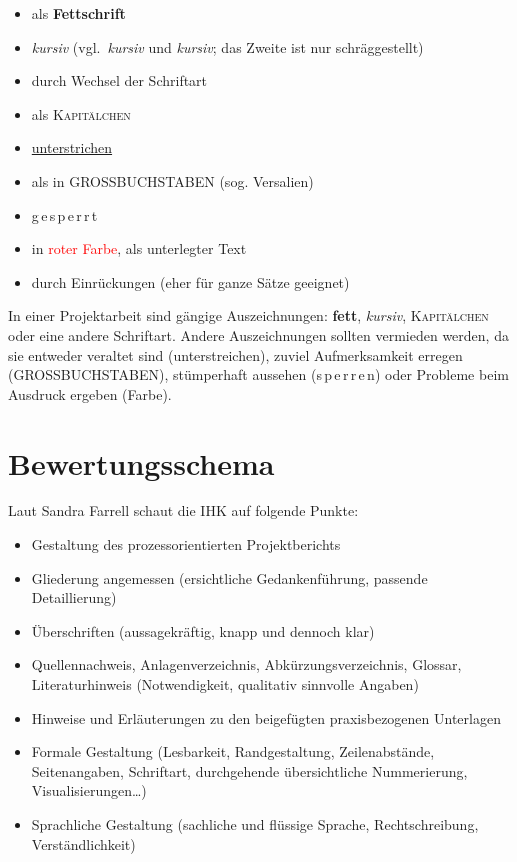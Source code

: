 \documentclass[a4paper,titlepage=true,twoside]{scrartcl}
\begin{document}
\begin{itemize}
 \item als \textbf{Fettschrift}
 \item \textit{kursiv} (vgl.\ \textit{kursiv} und \textsl{kursiv};
   das Zweite ist nur schräggestellt)
 \item \textsf{durch Wechsel der Schriftart}
 \item als \textsc{Kapitälchen}
 \item \underline{unterstrichen}
 \item als in GROSSBUCHSTABEN (sog. Versalien)
 \item g\,e\,s\,p\,e\,r\,r\,t
 \item in \textcolor{red}{roter Farbe}, als \colorbox{light}{unterlegter Text}
 \item durch Einrückungen (eher für ganze Sätze geeignet)
\end{itemize}

In einer Projektarbeit sind gängige Auszeichnungen: \textbf{fett}, \textit{kursiv},
\textsc{Kapitälchen} oder eine andere \textsf{Schriftart}. Andere Auszeichnungen
sollten vermieden werden, da sie entweder veraltet sind (unterstreichen), zuviel
Aufmerksamkeit erregen (GROSSBUCHSTABEN), stümperhaft aussehen
(s\,p\,e\,r\,r\,e\,n) oder Probleme beim Ausdruck ergeben (Farbe).


\appendix
\section{Bewertungsschema}
Laut Sandra Farrell schaut die IHK auf folgende Punkte:

\begin{itemize}
 \item Gestaltung des prozessorientierten Projektberichts
 \item Gliederung angemessen (ersichtliche Gedankenführung, passende Detaillierung)
 \item Überschriften (aussagekräftig, knapp und dennoch klar)
 \item Quellennachweis, Anlagenverzeichnis, Abkürzungsverzeichnis, Glossar,
       Literaturhinweis (Notwendigkeit, qualitativ sinnvolle Angaben)
 \item Hinweise und Erläuterungen zu den beigefügten praxisbezogenen Unterlagen
 \item Formale Gestaltung (Lesbarkeit, Randgestaltung, Zeilenabstände, Seitenangaben,
       Schriftart, durchgehende übersichtliche Nummerierung, Visualisierungen\ldots)
 \item Sprachliche Gestaltung (sachliche und flüssige Sprache, Rechtschreibung,
       Verständlichkeit)
\end{itemize}
\end{document}

